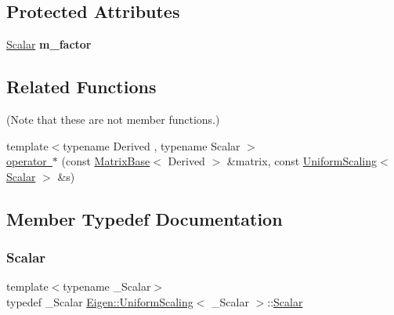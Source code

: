 \subsection*{Protected Attributes}
\begin{DoxyCompactItemize}
\item 
\mbox{\label{class_eigen_1_1_uniform_scaling_a6f473538d51d9d2966077a11acd2c071}} 
\mbox{\hyperlink{class_eigen_1_1_uniform_scaling_a04c4339f58f1210c5d4d34b1bd7ae283}{Scalar}} {\bfseries m\+\_\+factor}
\end{DoxyCompactItemize}
\subsection*{Related Functions}
(Note that these are not member functions.) \begin{DoxyCompactItemize}
\item 
{\footnotesize template$<$typename Derived , typename Scalar $>$ }\\\mbox{\hyperlink{group___geometry___module_gae9451098be60e8ceda3c583d96e0aee1}{operator $\ast$}} (const \mbox{\hyperlink{class_eigen_1_1_matrix_base}{Matrix\+Base}}$<$ Derived $>$ \&matrix, const \mbox{\hyperlink{class_eigen_1_1_uniform_scaling}{Uniform\+Scaling}}$<$ \mbox{\hyperlink{class_eigen_1_1_uniform_scaling_a04c4339f58f1210c5d4d34b1bd7ae283}{Scalar}} $>$ \&s)
\end{DoxyCompactItemize}


\subsection{Member Typedef Documentation}
\mbox{\label{class_eigen_1_1_uniform_scaling_a04c4339f58f1210c5d4d34b1bd7ae283}} 
\subsubsection{\texorpdfstring{Scalar}{Scalar}}
{\footnotesize\ttfamily template$<$typename \+\_\+\+Scalar$>$ \\
typedef \+\_\+\+Scalar \mbox{\hyperlink{class_eigen_1_1_uniform_scaling}{Eigen\+::\+Uniform\+Scaling}}$<$ \+\_\+\+Scalar $>$\+::\mbox{\hyperlink{class_eigen_1_1_uniform_scaling_a04c4339f58f1210c5d4d34b1bd7ae283}{Scalar}}}

